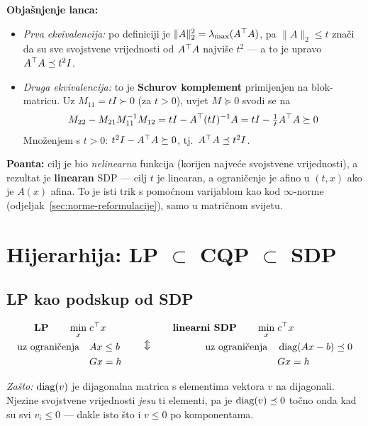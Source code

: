 \textbf{Objašnjenje lanca:}

\begin{itemize}
  \item \emph{Prva ekvivalencija:} po definiciji je $\|A\|_2^2 =
        \lambda_{\max}(A\T A)$, pa $\|A\|_2 \le t$ znači da su sve svojstvene
        vrijednosti od $A\T A$ najviše $t^2$ --- a to je upravo
        $A\T A \preceq t^2 I$.
  \item \emph{Druga ekvivalencija:} to je \textbf{Schurov komplement}
        primijenjen na blok-matricu. Uz $M_{11} = tI \succ 0$ (za $t>0$),
        uvjet $M \succeq 0$ svodi se na
        \[
        M_{22} - M_{21}M_{11}^{-1}M_{12} = tI - A\T(tI)^{-1}A
        = tI - \tfrac1t A\T A \succeq 0
        \]
        Množenjem s $t > 0$: $t^2I - A\T A \succeq 0$, tj.\
        $A\T A \preceq t^2I$. \checkmark
\end{itemize}

\textbf{Poanta:} cilj je bio \emph{nelinearna} funkcija (korijen najveće
svojstvene vrijednosti), a rezultat je \textbf{linearan} SDP --- cilj $t$ je
linearan, a ograničenje je afino u $(t,x)$ ako je $A(x)$ afina. To je isti
trik s pomoćnom varijablom kao kod $\infty$-norme
(odjeljak~\ref{sec:norme-reformulacije}), samo u matričnom svijetu.

\section{Hijerarhija: LP $\subset$ CQP $\subset$ SDP}

\subsection{LP kao podskup od SDP}

\[
\begin{aligned}
\text{\textbf{LP}} \qquad
\min_x \; & c\T x \\
\uzogr & Ax \le b \\
& Gx = h
\end{aligned}
\qquad\Updownarrow\qquad
\begin{aligned}
\text{\textbf{linearni SDP}} \qquad
\min_x \; & c\T x \\
\uzogr & \diag(Ax - b) \preceq 0 \\
& Gx = h
\end{aligned}
\]

\emph{Zašto:} $\diag(v)$ je dijagonalna matrica s elementima vektora $v$ na
dijagonali. Njezine svojstvene vrijednosti \emph{jesu} ti elementi, pa je
$\diag(v) \preceq 0$ točno onda kad su svi $v_i \le 0$ --- dakle isto što i
$v \le 0$ po komponentama. \checkmark

